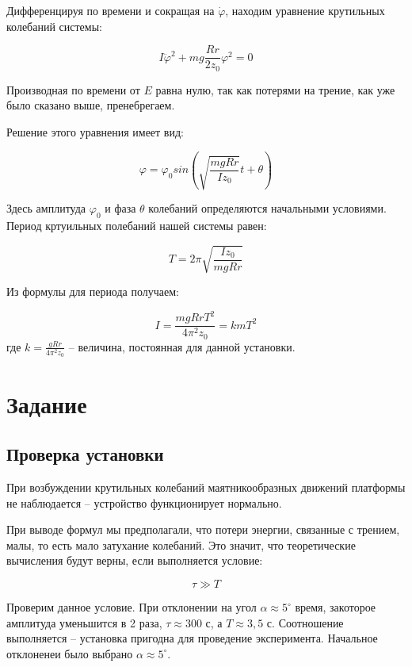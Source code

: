 \documentclass[a4paper,12pt]{article}
\begin{document}
	Дифференцируя по времени и сокращая на $\dot\varphi$, находим уравнение крутильных колебаний системы:
	
	\begin{equation}
		I\ddot\varphi^2 + mg\frac{Rr}{2z_0}\varphi^2 = 0
	\end{equation}
		
	Производная по времени от $E$ равна нулю, так как потерями на трение, как уже было сказано выше, пренебрегаем.
	
	Решение этого уравнения имеет вид:
	
	\begin{equation}
		\varphi = \varphi_0 sin \left(\sqrt{\frac{mgRr}{Iz_0}}t + \theta\right)
	\end{equation}

	Здесь амплитуда $\varphi_0$ и фаза $\theta$ колебаний определяются начальными условиями. Период кртуильных полебаний нашей системы равен:
	
	\begin{equation}
		T = 2\pi \sqrt{\frac{Iz_0}{mgRr}}
	\end{equation}

	Из формулы для периода получаем:
	
	\begin{equation}\label{momin}
		I = \frac{mgRrT^2}{4 \pi^2z_0} = kmT^2
	\end{equation}
	\noindent где $k = \frac{gRr}{4\pi^2z_0}$ -- величина, постоянная для данной установки.
	
	\section{Задание}
	\subsection{Проверка установки}
	При возбуждении крутильных колебаний маятникообразных движений платформы не наблюдается -- устройство функционирует нормально.
	
	При выводе формул мы предполагали, что потери энергии, связанные с трением, малы, то есть мало затухание колебаний. Это значит, что теоретические вычисления будут верны, если выполняется условие:
	
	\begin{equation}
		\tau \gg T
	\end{equation}
	
	Проверим данное условие. При отклонении на угол $\alpha \approx 5^\circ$ время, закоторое амплитуда уменьшится в 2 раза, $\tau \approx 300\text{ с}$, а $T \approx 3,5\text{ с}$. Соотношение выполняется -- установка пригодна для проведение эксперимента. Начальное отклоненеи было выбрано $\alpha \approx 5^\circ$.
	
\end{document}
